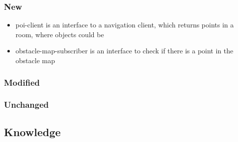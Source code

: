 \documentclass[main.tex]{subfiles}
\begin{document}
                \subsubsection{New}
                \begin{itemize}
 				 \item poi-client is an interface to a navigation client, which returns points in a room, where objects could be 
  				 \item obstacle-map-subscriber is an interface to check if there is a point in the obstacle map
				\end{itemize}  
                \subsubsection{Modified}
                \subsubsection{Unchanged}
                \subsection{Knowledge}
\end{document}
